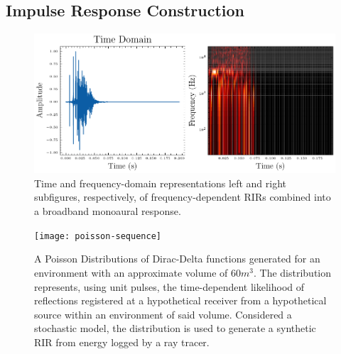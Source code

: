 \subsection{Impulse Response Construction}
\begin{figure}[htbp]
    \centering
    \includegraphics[width=1\linewidth]{rir-rt-final}
    \caption{Time and frequency-domain representations left and right subfigures, respectively, of frequency-dependent RIRs combined into a broadband monoaural response. }
    \label{fig:rir-freqdep-monoaural}
\end{figure}

\begin{figure}[htbp]
    \centering
    \texttt{[image: poisson-sequence]}
    \caption{A Poisson Distributions of Dirac-Delta functions generated for an environment with an approximate volume of $60m^3$. The distribution represents, using unit pulses, the time-dependent likelihood of reflections registered at a hypothetical receiver from a hypothetical source within an environment of said volume. Considered a stochastic model, the distribution is used to generate a synthetic RIR from energy logged by a ray tracer.}
    \label{fig:poisson-sequence}
\end{figure}

